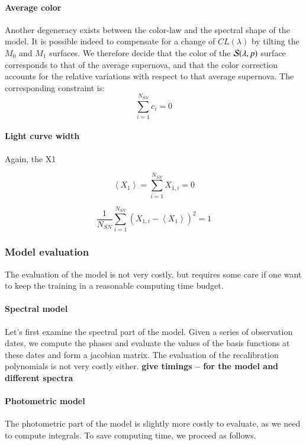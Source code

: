 \documentclass{aa}
\begin{document}
\paragraph{Average color} Another degeneracy exists between the color-law and the spectral
shape of the model. It is possible indeed to compensate for a change
of $CL(\lambda)$ by tilting the $M_0$ and $M_1$ surfaces.  We
therefore decide that the color of the ${\cal S}(\lambda,p)$ surface
corresponds to that of the average supernova, and that the color
correction accounts for the relative variations with respect to that
average supernova. The corresponding constraint is:
\begin{equation}
  \sum_{i=1}^{N_{SN}} c_i = 0
\end{equation}


\paragraph{Light curve width} Again, the X1

\begin{equation}
  \left<X_1\right> = \sum_{i=1}^{N_{SN}}  X_{1,i} = 0
\end{equation}


\begin{equation}
  \frac{1}{N_{SN}} \sum_{i=1}^{N_{SN}}  (X_{1,i} - \left<X_1\right>)^2 = 1
\end{equation}



\subsubsection{Model evaluation}

The evaluation of the model is not very costly, but requires some care
if one want to keep the training in a reasonable computing time
budget.

\paragraph{Spectral model}
Let's first examine the spectral part of the model. Given a series of
observation dates, we compute the phases and evaluate the values of
the basis functions at these dates and form a jacobian matrix. The
evaluation of the recalibration polynomials is not very costly
either. {\bfseries give timings -- for the model and different spectra}

\paragraph{Photometric model}
The photometric part of the model is slightly more costly to evaluate,
as we need to compute integrals. To save computing time, we proceed as
follows.
\end{document}
